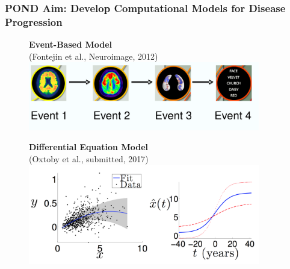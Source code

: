 \documentclass[8pt,xcolor=table]{beamer}
\begin{document}
\begin{frame}
\frametitle{POND Aim: Develop Computational Models for Disease Progression}

\newcommand{\mnpHeight}{3cm}

\vspace{-3em}
  
  
  \hspace{-2em}
  \begin{small}
  \begin{figure}[h]
  \centering
    \begin{minipage}[t][\mnpHeight][t]{0.49\linewidth}
  \centering
    \textbf{Event-Based Model}\\ \footnotesize{(Fontejin et al., Neuroimage, 2012)}\\    
    \includegraphics[width=0.9\textwidth,trim=0 0 0 0,clip]{../ebm_openday}
      \vspace{1em}
  \end{minipage}
  \begin{minipage}[t][\mnpHeight][t]{0.49\linewidth}
    \centering
    \textbf{Differential Equation Model}\\ \footnotesize{(Oxtoby et al., submitted, 2017)}
    \includegraphics[width=0.9\textwidth,trim=0 0 0 0, clip]{../dem_neil}
  \end{minipage}


\end{figure}
\end{small}
\end{frame}
\end{document}
